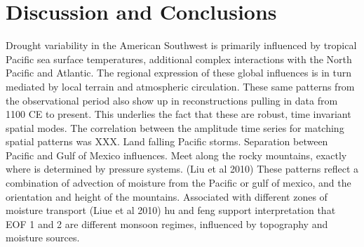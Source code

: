 \documentclass[11pt]{wlscirep}
\begin{document}
\section*{Discussion and Conclusions}
Drought variability in the American Southwest is primarily influenced by tropical Pacific sea surface temperatures, additional complex interactions with the North Pacific and Atlantic. The regional expression of these global influences is in turn mediated by local terrain and atmospheric circulation. These same patterns from the observational period also show up in reconstructions pulling in data from 1100 CE to present. This underlies the fact that these are robust, time invariant spatial modes. The correlation between the amplitude time series for matching spatial patterns was XXX. 
Land falling Pacific storms. Separation between Pacific and Gulf of Mexico influences. Meet along the rocky mountains, exactly where is determined by pressure systems. (Liu et al 2010)
These patterns reflect a combination of advection of moisture from the Pacific or gulf of mexico, and the orientation and height of the mountains.
Associated with different zones of moisture transport (Liue et al 2010)
hu and feng support interpretation that EOF 1 and 2 are different monsoon regimes, influenced by topography and moisture sources.
\end{document}
